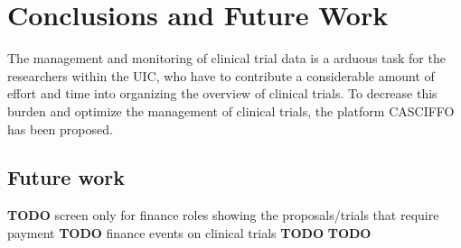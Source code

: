 % 
%
\chapter{Conclusions and Future Work}\label{ch:conclusion}
The management and monitoring of clinical trial data is a arduous task for the researchers within the UIC, who have to contribute a considerable amount of effort and time into organizing the overview of clinical trials. To decrease this burden and optimize the management of clinical trials, the platform CASCIFFO has been proposed.



\section{Future work}\label{sec:future-work}

\textbf{TODO} screen only for finance roles showing the proposals/trials that require payment
\textbf{TODO} finance events on clinical trials 
\textbf{TODO} 
\textbf{TODO} 